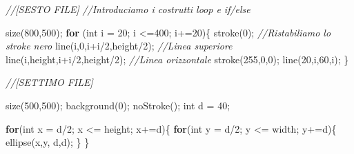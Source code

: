 \documentclass[
]{article}
\newenvironment{Shaded}{}{}
\newcommand{\CommentTok}[1]{\textcolor[rgb]{0.38,0.63,0.69}{\textit{#1}}}
\newcommand{\ControlFlowTok}[1]{\textcolor[rgb]{0.00,0.44,0.13}{\textbf{#1}}}
\newcommand{\DataTypeTok}[1]{\textcolor[rgb]{0.56,0.13,0.00}{#1}}
\newcommand{\DecValTok}[1]{\textcolor[rgb]{0.25,0.63,0.44}{#1}}
\newcommand{\FunctionTok}[1]{\textcolor[rgb]{0.02,0.16,0.49}{#1}}
\newcommand{\NormalTok}[1]{#1}
\newcommand{\OperatorTok}[1]{\textcolor[rgb]{0.40,0.40,0.40}{#1}}
\begin{document}
\begin{Shaded}
\begin{Highlighting}[]
\CommentTok{//[SESTO FILE]}
\CommentTok{//Introduciamo i costrutti loop e if/else}

\FunctionTok{size}\OperatorTok{(}\DecValTok{800}\OperatorTok{,}\DecValTok{500}\OperatorTok{);}
\ControlFlowTok{for} \OperatorTok{(}\DataTypeTok{int}\NormalTok{ i }\OperatorTok{=} \DecValTok{20}\OperatorTok{;}\NormalTok{ i }\OperatorTok{\textless{}=}\DecValTok{400}\OperatorTok{;}\NormalTok{ i}\OperatorTok{+=}\DecValTok{20}\OperatorTok{)\{}
  \FunctionTok{stroke}\OperatorTok{(}\DecValTok{0}\OperatorTok{);} \CommentTok{//Ristabiliamo lo stroke nero}
  \FunctionTok{line}\OperatorTok{(}\NormalTok{i}\OperatorTok{,}\DecValTok{0}\OperatorTok{,}\NormalTok{i}\OperatorTok{+}\NormalTok{i}\OperatorTok{/}\DecValTok{2}\OperatorTok{,}\NormalTok{height}\OperatorTok{/}\DecValTok{2}\OperatorTok{);} \CommentTok{//Linea superiore}
  \FunctionTok{line}\OperatorTok{(}\NormalTok{i}\OperatorTok{,}\NormalTok{height}\OperatorTok{,}\NormalTok{i}\OperatorTok{+}\NormalTok{i}\OperatorTok{/}\DecValTok{2}\OperatorTok{,}\NormalTok{height}\OperatorTok{/}\DecValTok{2}\OperatorTok{);} \CommentTok{//Linea orizzontale}
  \FunctionTok{stroke}\OperatorTok{(}\DecValTok{255}\OperatorTok{,}\DecValTok{0}\OperatorTok{,}\DecValTok{0}\OperatorTok{);}
  \FunctionTok{line}\OperatorTok{(}\DecValTok{20}\OperatorTok{,}\NormalTok{i}\OperatorTok{,}\DecValTok{60}\OperatorTok{,}\NormalTok{i}\OperatorTok{);}
\OperatorTok{\}}
\end{Highlighting}
\end{Shaded}

\begin{Shaded}
\begin{Highlighting}[]
\CommentTok{//[SETTIMO FILE]}

\FunctionTok{size}\OperatorTok{(}\DecValTok{500}\OperatorTok{,}\DecValTok{500}\OperatorTok{);}
\FunctionTok{background}\OperatorTok{(}\DecValTok{0}\OperatorTok{);}
\FunctionTok{noStroke}\OperatorTok{();}
\DataTypeTok{int}\NormalTok{ d }\OperatorTok{=} \DecValTok{40}\OperatorTok{;}

\ControlFlowTok{for}\OperatorTok{(}\DataTypeTok{int}\NormalTok{ x }\OperatorTok{=}\NormalTok{ d}\OperatorTok{/}\DecValTok{2}\OperatorTok{;}\NormalTok{ x }\OperatorTok{\textless{}=}\NormalTok{ height}\OperatorTok{;}\NormalTok{ x}\OperatorTok{+=}\NormalTok{d}\OperatorTok{)\{}
  \ControlFlowTok{for}\OperatorTok{(}\DataTypeTok{int}\NormalTok{ y }\OperatorTok{=}\NormalTok{ d}\OperatorTok{/}\DecValTok{2}\OperatorTok{;}\NormalTok{ y }\OperatorTok{\textless{}=}\NormalTok{ width}\OperatorTok{;}\NormalTok{ y}\OperatorTok{+=}\NormalTok{d}\OperatorTok{)\{}
     \FunctionTok{ellipse}\OperatorTok{(}\NormalTok{x}\OperatorTok{,}\NormalTok{y}\OperatorTok{,}\NormalTok{ d}\OperatorTok{,}\NormalTok{d}\OperatorTok{);}
 \OperatorTok{\}}
\OperatorTok{\}}
\end{Highlighting}
\end{Shaded}
\end{document}
